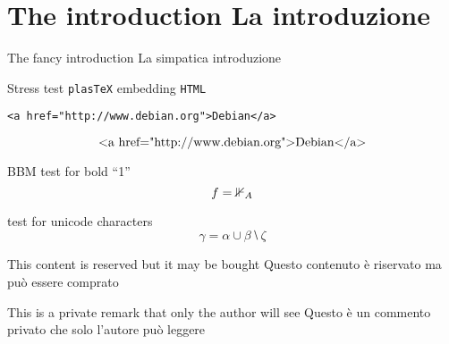 \section*{\ifCDLeng The introduction \fi  \ifCDLita La introduzione\fi}
\ifCDLeng The fancy introduction \fi  \ifCDLita La simpatica introduzione\fi

\begin{abstract}
  \CDLeng  This simple \LaTeX\ tests some features  of \texttt{plasTeX} and \texttt{ColDoc}.
  \CDLita Questo semplice file  \LaTeX\ mostra le funzionalità di  \texttt{plasTeX} e \texttt{ColDoc}.

  \ifetex Using  \TeX \fi ;
  \ifxetex Using \texttt{XeTeX} \fi ;
  \ifluatex Using \texttt{LuaTeX} \fi ;
  \iftutex Using \texttt{XeTeX} or \texttt{LuaTeX} \fi ;
  \ifplastex Using \texttt{plasTeX} \fi .

\end{abstract}

Stress test  \texttt{plasTeX} embedding \texttt{HTML}
\begin{verbatim}
<a href="http://www.debian.org">Debian</a>
\end{verbatim}
\[ \hbox{<a href="http://www.debian.org">Debian</a>} \]

BBM test for bold ``1''
\[f={\mathbbm{1}}_A\]

test for unicode characters
\[ 𝛾 = 𝛼 ∪ 𝛽 ⧵ 𝜁  \]


\begin{buyablecontent}
  \CDLeng  This content is reserved but it may be bought
  \CDLita  Questo contenuto è riservato ma può essere comprato
\end{buyablecontent}

\begin{privateremark}
  \CDLeng This is a private remark that only the author will see
  \CDLita Questo è un commento privato che solo l'autore può leggere
\end{privateremark}

